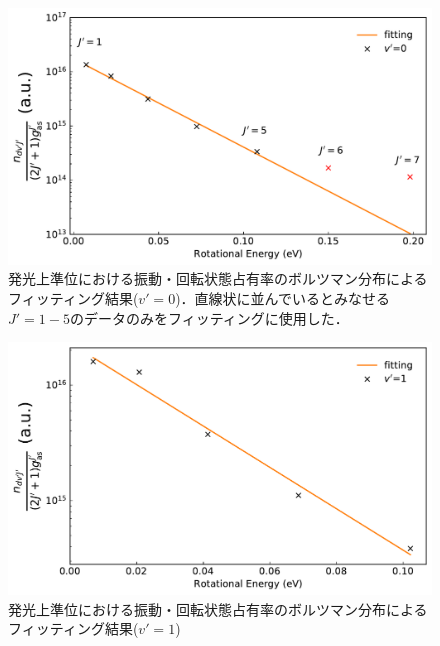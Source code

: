 \begin{figure}
    \centering
    \includegraphics[width=15cm]{pictures/upper-fitting-0.pdf}
    \caption[発光上準位における振動・回転状態占有率のボルツマン分布によるフィッティング結果($v'=0$)]{発光上準位における振動・回転状態占有率のボルツマン分布によるフィッティング結果($v'=0$)．直線状に並んでいるとみなせる$J'=1-5$のデータのみをフィッティングに使用した．}
    \label{fig:upper-fitting-0}
\end{figure}

\begin{figure}
    \centering
    \includegraphics[width=15cm]{pictures/upper-fitting-1.pdf}
    \caption{発光上準位における振動・回転状態占有率のボルツマン分布によるフィッティング結果($v'=1$)}
    \label{fig:upper-fitting-1}
\end{figure}

